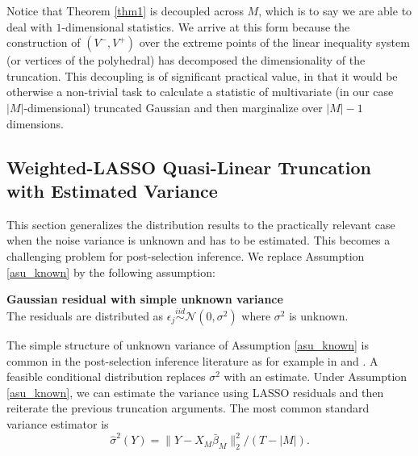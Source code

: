 \documentclass[11pt]{article}
\newcommand{\iid}{\stackrel{iid}{\sim}}
\def\cmt#1{{\textcolor{red}{(#1)}}}
\begin{document}

Notice that Theorem \ref{thm1} is decoupled across $M$, which is to say we are able to deal with $1$-dimensional statistics. We arrive at this form because the construction of $(V^-,V^+)$ over the extreme points of the linear inequality system (or vertices of the polyhedral) has decomposed the dimensionality of the truncation. This decoupling is of significant practical value, in that it would be otherwise a non-trivial task to calculate a statistic of multivariate (in our case $|M|$-dimensional) truncated Gaussian and then marginalize over $|M|-1$ dimensions.


\subsection{Weighted-LASSO Quasi-Linear Truncation with Estimated Variance}\label{lab:appendixA2}

This section generalizes the distribution results to the practically relevant case when the noise variance is unknown and has to be estimated. This becomes a challenging problem for post-selection inference. We replace Assumption \ref{asu_known} by the following assumption:

\begin{assumption_app}{\bf Gaussian residual with simple unknown variance}\label{asu_unknown}\\
	The residuals are distributed as $\epsilon_j\iid \mathcal{N}(0,\sigma^2)$ where $\sigma^2$ is unknown.
\end{assumption_app}


The simple structure of unknown variance of Assumption \ref{asu_known} is common in the post-selection inference literature as for example in \cite{lee2016exact} and \cite{tian2017selective}. A feasible conditional distribution replaces $\sigma^2$ with an estimate. Under Assumption \ref{asu_known}, we can estimate the variance using LASSO residuals and then reiterate the previous truncation arguments. The most common standard variance estimator is
\begin{equation}\label{eq21:sd.est}
	\hat{\sigma}^2(Y)=\|Y-X_M\bar{\beta}_M\|_2^2/(T-|M|).
\end{equation}
\end{document}
